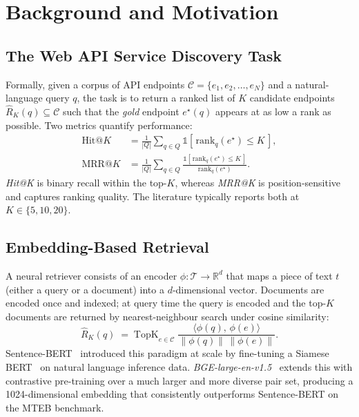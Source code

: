 \documentclass[10pt,a4paper,twocolumn]{article}
\begin{document}
\section{Background and Motivation}\label{sec:background}

\subsection{The Web API Service Discovery Task}

Formally, given a corpus of API endpoints
\(\mathcal{C}=\{e_1, e_2, \dots, e_N\}\) and a natural-language query
\(q\), the task is to return a ranked list of \(K\) candidate endpoints
\(\hat{R}_K(q) \subseteq \mathcal{C}\) such that the \emph{gold} endpoint
\(e^{\star}(q)\) appears at as low a rank as possible. Two metrics
quantify performance:
\begin{align}
  \mathrm{Hit@}K &= \frac{1}{|Q|} \sum_{q \in Q}
                 \mathbb{1}\!\left[\,\mathrm{rank}_q(e^{\star}) \le K\,\right], \label{eq:hit}\\
  \mathrm{MRR@}K &= \frac{1}{|Q|} \sum_{q \in Q}
                 \frac{\mathbb{1}\!\left[\,\mathrm{rank}_q(e^{\star}) \le K\,\right]}{\mathrm{rank}_q(e^{\star})}. \label{eq:mrr}
\end{align}
\emph{Hit@K} is binary recall within the top-$K$, whereas \emph{MRR@K} is
position-sensitive and captures ranking quality. The literature
typically reports both at $K \in \{5, 10, 20\}$.

\subsection{Embedding-Based Retrieval}

A neural retriever consists of an encoder
\(\phi : \mathcal{T} \to \mathbb{R}^d\) that maps a piece of text \(t\)
(either a query or a document) into a \(d\)-dimensional vector.
Documents are encoded once and indexed; at query time the query is
encoded and the top-\(K\) documents are returned by nearest-neighbour
search under cosine similarity:
\[
  \hat{R}_K(q) \;=\; \mathrm{TopK}_{e \in \mathcal{C}} \;
  \frac{\langle \phi(q),\, \phi(e)\rangle}{\|\phi(q)\|\,\|\phi(e)\|}.
\]
Sentence-BERT~\cite{reimers2019sbert} introduced this paradigm at scale
by fine-tuning a Siamese BERT~\cite{devlin2019bert} on natural language
inference data. \emph{BGE-large-en-v1.5}~\cite{xiao2023cpack} extends
this with contrastive pre-training over a much larger and more diverse
pair set, producing a 1024-dimensional embedding that consistently
outperforms Sentence-BERT on the MTEB benchmark.
\end{document}
